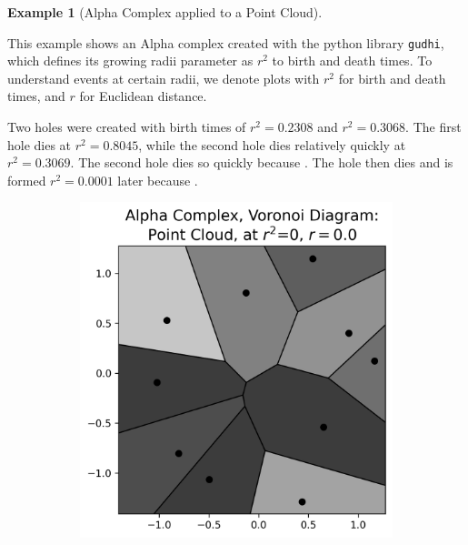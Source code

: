 \documentclass[ma]{uncgdissertationexp}
\theoremstyle{plain}
\theoremstyle{definition}
\newtheorem{example}[theorem]{Example}
\theoremstyle{remark}
\begin{document}
\newpage
\begin{example}[Alpha Complex applied to a Point Cloud]\label{ex:point_cloud_alpha}
\par This example shows an Alpha complex created with the python library \verb"gudhi", which defines its growing radii parameter as $r^{2}$ to birth and death times. To understand events at certain radii, we denote plots with $r^{2}$ for birth and death times, and $r$ for Euclidean distance.
\par Two holes were created with birth times of $r^{2}=0.2308$ and $r^{2}=0.3068$. The first hole dies at $r^{2}=0.8045$, while the second hole dies relatively quickly at $r^{2}=0.3069$. The second hole dies so quickly because . The hole then dies and is formed $r^{2}=0.0001$ later because .
\begin{figure}[H]
    \centering
    \begin{subfigure}[b]{0.28\textwidth}
        \includegraphics[width=\textwidth]{point_cloud_plot_alpha_0.png}
    \end{subfigure}
    \hfill
    \begin{subfigure}[b]{0.28\textwidth}

\end{subfigure}
\end{figure}
\end{example}
\end{document}

